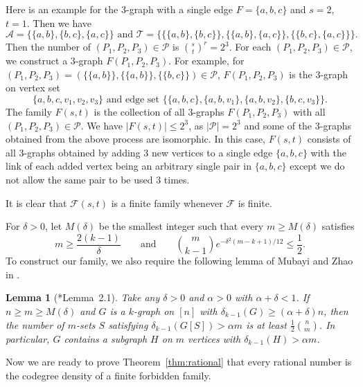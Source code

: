 \documentclass[11pt,a4paper]{article}
\newtheorem{lemma}[definition]{Lemma}
\theoremstyle{remark}
\begin{document}
Here is an example for the 3-graph with a single edge 
$F=\{a,b,c\}$ and $s=2$, $t=1$. 
Then we have \[\mathcal{A} = \{\{a,b\},\{b,c\},\{a,c\}\}\text{ and } \mathcal{T} =\{\{\{a,b\},\{b,c\}\},\{\{a,b\},\{a,c\}\},\{\{b,c\},\{a,c\}\}\}.
\] Then the number of $(P_1,P_2,P_3) \in \mathcal{P}$ is $\binom{s}{t}^r = 2^3$. For each $(P_1,P_2,P_3) \in \mathcal{P}$, we construct a $3$-graph $F(P_1,P_2,P_3)$. For example, for $(P_1,P_2,P_3) = (\{\{a,b\}\},\{\{a,b\}\},\{\{b,c\}\}) \in \mathcal{P}$, $F(P_1,P_2,P_3)$ is the $3$-graph on vertex set \[\{a,b,c,v_1,v_2,v_3\} \text{ and edge set } \{\{a,b,c\},\{a,b,v_1\},\{a,b,v_2\},\{b,c,v_3\}\}.\]
The family $F(s,t)$ is the collection of all $3$-graphs $F(P_1,P_2,P_3)$ with all $(P_1,P_2,P_3)\in \mathcal{P}$. 
We have $|F(s,t)| \le 2^3$, as $|\mathcal{P}| = 2^3$ and some of the $3$-graphs obtained from the above process are isomorphic. In this case, $F(s,t)$ consists of all $3$-graphs obtained by adding 3 new vertices to a single edge $\{a,b,c\}$ with the link of each added vertex being an arbitrary single pair in $\{a,b,c\}$ except we do not allow the same pair to be used 3 times.  

It is clear that $\mathcal{F}(s,t)$ is a finite family whenever $\mathcal{F}$ is finite.

For $ \delta > 0$, let  $M(\delta)$ be the smallest integer such that every $m \ge M(\delta)$ satisfies
\[
m \ge \frac{2(k-1)}{\delta}
\qquad\text{and}\qquad
\binom{m}{k-1} e^{-\delta^{2}(m-k+1)/12} \le \frac{1}{2}.
\]
To construct our family, we also require the following lemma of Mubayi and Zhao in \cite{MZ07}.
\begin{lemma}[\cite{MZ07}*{Lemma~2.1}]
\label{lem:sub-large-co}
Take any $\delta>0$ and $\alpha > 0$ with $\alpha + \delta < 1$.
If $n \ge m \ge M(\delta)$ and $G$ is a $k$-graph on $[n]$ with $\delta_{k-1}(G) \ge (\alpha + \delta)n$, then the number of $m$-sets $S$ satisfying $\delta_{k-1}(G[S]) > \alpha m$ is at least $\frac{1}{2} \binom{n}{m}$. In particular, $G$ contains a subgraph $H$ on $m$ vertices with $\delta_{k-1} (H) > \alpha m$.
\end{lemma}

Now we are ready to prove Theorem~\ref{thm:rational} that every rational number is the codegree density of a finite forbidden family.
\end{document}
